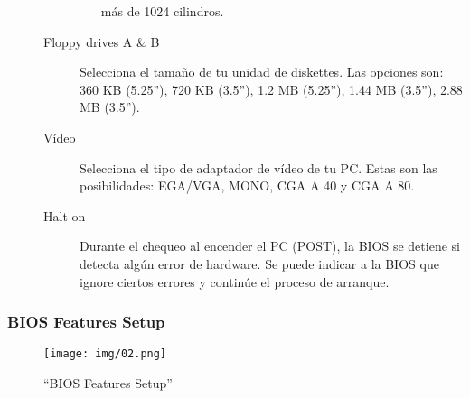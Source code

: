 \documentclass[12pt,oneside,a4paper]{article}
\begin{document}
\begin{description}
\begin{description}
\begin{itemize}
								más de 1024 cilindros.
						\end{itemize}
					\item[Floppy drives A \& B] Selecciona el tamaño de tu
						unidad de diskettes. Las opciones son: 360 KB (5.25”),
						720 KB (3.5”), 1.2 MB (5.25”), 1.44 MB (3.5”), 2.88 MB
						(3.5”).
					\item[Vídeo] Selecciona el tipo de adaptador de
						vídeo de tu PC. Estas son las posibilidades: EGA/VGA,
						MONO, CGA A 40 y CGA A 80.
					\item[Halt on] Durante el chequeo al encender el PC (POST),
						la BIOS se detiene si detecta algún error de hardware.
						Se puede indicar a la BIOS que ignore ciertos errores y
						continúe el proceso de arranque.

					\end{description}
				\end{description}

		\subsubsection{BIOS Features Setup}{\label{sub:bios features setup}}
			\begin{figure}[H]
				\centering
					\texttt{[image: img/02.png]}
				\caption{``BIOS Features Setup''}
			\end{figure}
\end{document}
